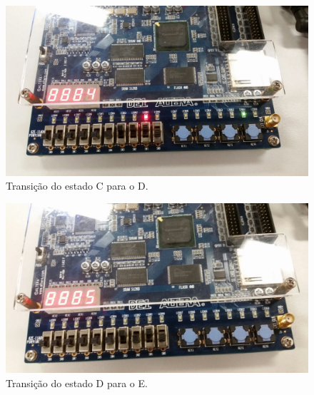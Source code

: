 		\begin{figure}[H]
			\includegraphics[width=1\textwidth]{img/placa/4}
			\caption{Transição do estado C para o D.\label{figura:deployMaquina4}}
		\end{figure}

		\begin{figure}[H]
			\includegraphics[width=1\textwidth]{img/placa/5}
			\caption{Transição do estado D para o E.\label{figura:deployMaquina5}}
		\end{figure}


